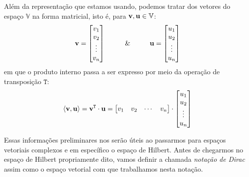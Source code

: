 Além da representação que estamos usando, podemos tratar dos vetores do espaço $\mathbb{V}$ na forma matricial, isto é, para $\vb{v},\vb{u}\in \mathbb{V}$:
    \begin{equation*}
    \vb{v} = 
        \begin{bmatrix}
            v_{1} \\
            v_{2} \\
            \vdots \\
            v_n
        \end{bmatrix} \hspace{1cm} \& \hspace{1cm}
    \vb{u} = 
        \begin{bmatrix}
            u_{1} \\
            u_{2} \\
            \vdots \\
            u_n
        \end{bmatrix}
\end{equation*}
em que o produto interno passa a ser expresso por meio da operação de transposição $\mathtt{T}$:
\begin{equation*}
    \langle\vb{v},\vb{u}\rangle = \vb{v}^\mathtt{T}\cdot \vb{u} =
    \begin{bmatrix}
        v_1 & v_2 & \cdots & v_n
    \end{bmatrix}
    \cdot
    \begin{bmatrix}
        u_1 \\
        u_2 \\
        \vdots \\
        u_n
    \end{bmatrix}
\end{equation*}


Essas informações preliminares nos serão úteis ao passarmos para espaços vetoriais complexos e em específico o espaço de Hilbert. Antes de chegarmos no espaço de Hilbert propriamente dito, vamos definir a chamada \textit{notação de Dirac} assim como o espaço vetorial com que trabalhamos nesta notação.


































